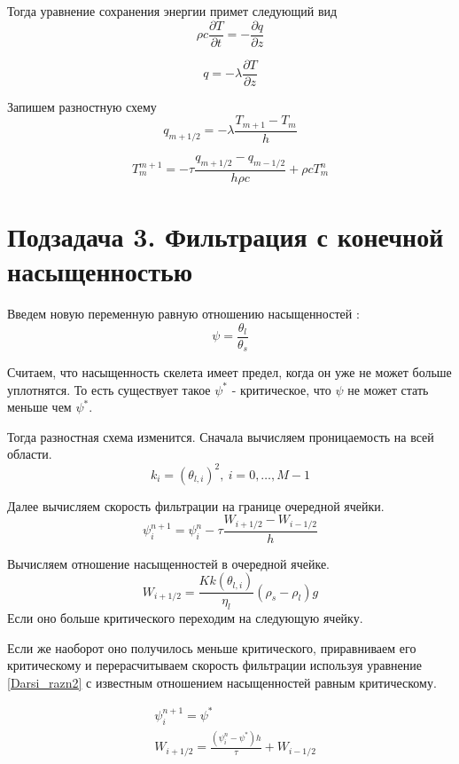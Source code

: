 \documentclass[12pt]{article}
\newcommand{\pd}[2]{\frac{\partial #1}{\partial #2}}
\begin{document}
Тогда уравнение сохранения энергии примет следующий вид
\begin{equation}
\rho c \pd{T}{t} = - \pd{q}{z}
\label{termal_1}
\end{equation}

\begin{equation}
q = - \lambda\pd{T}{z}
\label{termal_2}
\end{equation}

Запишем разностную схему
\begin{equation}
q_{m+1/2} = - \lambda\frac{T_{m+1} - T_m}{h}
\label{termal_razn_1}
\end{equation}

\begin{equation}
T_m^{m+1} = - \tau\frac{q_{m+1/2} - q_{m-1/2}}{h\rho c} + \rho c T_m^n
\label{termal_razn_2}
\end{equation}

\newpage
\section*{Подзадача 3. Фильтрация с конечной насыщенностью}
Введем новую переменную равную отношению насыщенностей : 
$$
\psi = \frac{\theta_l}{\theta_s} 
$$

Считаем, что насыщенность скелета имеет предел, когда он уже не может больше уплотнятся. То есть существует такое $ \psi^* $ - критическое, что $\psi $ не может стать меньше чем $\psi^*$. 

Тогда разностная схема изменится. 
Сначала вычисляем проницаемость на всей области.
\begin{equation}
k_i = (\theta_{l,i})^2 , \ i = 0,  \dots ,M-1
\label{perm_razn2}
\end{equation}

Далее вычисляем скорость фильтрации на границе очередной ячейки.
\begin{equation}
\psi_i^{n+1} = \psi_i^n - \tau\frac{W_{i+1/2} - W_{i-1/2}}{h}
\label{filtr_razn2}
\end{equation}

Вычисляем отношение насыщенностей в очередной ячейке. 
\begin{equation}
W_{i+1/2} = \frac{K k(\theta_{l,i})}{\eta_l}(\rho_s-\rho_l)g
\label{Darsi_razn2}
\end{equation}
Если оно больше критического переходим на следующую ячейку.

Если же наоборот оно получилось меньше критического, приравниваем его критическому и перерасчитываем скорость фильтрации используя уравнение \eqref{Darsi_razn2} с известным отношением насыщенностей равным критическому.

\begin{equation}
\begin{aligned}
&\psi_{i}^{n+1} = \psi^* \\
&W_{i+1/2} = \frac{(\psi_i^n - \psi^*)h}{\tau} + W_{i-1/2} \\
\end{aligned}
\label{corr_razn}
\end{equation}
\end{document}
